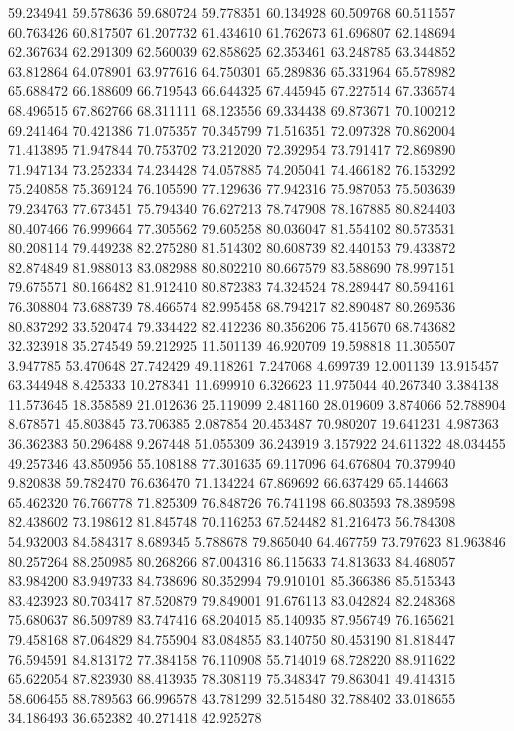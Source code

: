 59.234941
59.578636
59.680724
59.778351
60.134928
60.509768
60.511557
60.763426
60.817507
61.207732
61.434610
61.762673
61.696807
62.148694
62.367634
62.291309
62.560039
62.858625
62.353461
63.248785
63.344852
63.812864
64.078901
63.977616
64.750301
65.289836
65.331964
65.578982
65.688472
66.188609
66.719543
66.644325
67.445945
67.227514
67.336574
68.496515
67.862766
68.311111
68.123556
69.334438
69.873671
70.100212
69.241464
70.421386
71.075357
70.345799
71.516351
72.097328
70.862004
71.413895
71.947844
70.753702
73.212020
72.392954
73.791417
72.869890
71.947134
73.252334
74.234428
74.057885
74.205041
74.466182
76.153292
75.240858
75.369124
76.105590
77.129636
77.942316
75.987053
75.503639
79.234763
77.673451
75.794340
76.627213
78.747908
78.167885
80.824403
80.407466
76.999664
77.305562
79.605258
80.036047
81.554102
80.573531
80.208114
79.449238
82.275280
81.514302
80.608739
82.440153
79.433872
82.874849
81.988013
83.082988
80.802210
80.667579
83.588690
78.997151
79.675571
80.166482
81.912410
80.872383
74.324524
78.289447
80.594161
76.308804
73.688739
78.466574
82.995458
68.794217
82.890487
80.269536
80.837292
33.520474
79.334422
82.412236
80.356206
75.415670
68.743682
32.323918
35.274549
59.212925
11.501139
46.920709
19.598818
11.305507
3.947785
53.470648
27.742429
49.118261
7.247068
4.699739
12.001139
13.915457
63.344948
8.425333
10.278341
11.699910
6.326623
11.975044
40.267340
3.384138
11.573645
18.358589
21.012636
25.119099
2.481160
28.019609
3.874066
52.788904
8.678571
45.803845
73.706385
2.087854
20.453487
70.980207
19.641231
4.987363
36.362383
50.296488
9.267448
51.055309
36.243919
3.157922
24.611322
48.034455
49.257346
43.850956
55.108188
77.301635
69.117096
64.676804
70.379940
9.820838
59.782470
76.636470
71.134224
67.869692
66.637429
65.144663
65.462320
76.766778
71.825309
76.848726
76.741198
66.803593
78.389598
82.438602
73.198612
81.845748
70.116253
67.524482
81.216473
56.784308
54.932003
84.584317
8.689345
5.788678
79.865040
64.467759
73.797623
81.963846
80.257264
88.250985
80.268266
87.004316
86.115633
74.813633
84.468057
83.984200
83.949733
84.738696
80.352994
79.910101
85.366386
85.515343
83.423923
80.703417
87.520879
79.849001
91.676113
83.042824
82.248368
75.680637
86.509789
83.747416
68.204015
85.140935
87.956749
76.165621
79.458168
87.064829
84.755904
83.084855
83.140750
80.453190
81.818447
76.594591
84.813172
77.384158
76.110908
55.714019
68.728220
88.911622
65.622054
87.823930
88.413935
78.308119
75.348347
79.863041
49.414315
58.606455
88.789563
66.996578
43.781299
32.515480
32.788402
33.018655
34.186493
36.652382
40.271418
42.925278
